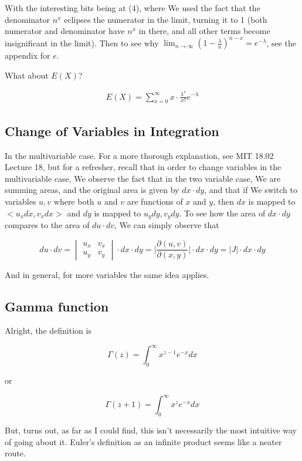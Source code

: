 \documentclass{article}
\begin{document}
			With the interesting bits being at (4), where We used the fact that the denominator $n^x$ eclipses the numerator in the limit, turning it to 1 (both numerator and denominator have $n^x$ in there, and all other terms become insignificant in the limit). Then to see why $\lim_{n\to\infty}\left(1 -\frac{\lambda}{n}\right)^{n-x} = e^{-\lambda}$, see the appendix for $e$.
			
			What about $E(X)$?
			
			\begin{align}
				E(X) = \sum^\infty_{x=0} x\cdot \frac{\lambda^x}{x!}e^{-\lambda}
			\end{align}
			
	\subsection{Change of Variables in Integration}
	
		In the multivariable case. For a more thorough explanation, see MIT 18.02 Lecture 18, but for a refresher, recall that in order to change variables in the multivariable case, We observe the fact that in the two variable case, We are summing areas, and the original area is given by $dx\cdot dy$, and that if We switch to variables $u, v$ where both $u$ and $v$ are functions of $x$ and $y$, then $dx$ is mapped to $<u_xdx, v_xdx>$ and $dy$ is mapped to $u_ydy, v_ydy$. To see how the area of $dx\cdot dy$ compares to the area of $du\cdot dv$, We can simply observe that
		
		\[
		du\cdot dv = 
		\begin{vmatrix}
		u_x & v_x\\
		u_y & v_y
		\end{vmatrix}
		\cdot dx\cdot dy =  \bigg|\frac{\partial(u, v)}{\partial(x, y)} \bigg|\cdot dx\cdot dy = |J|\cdot dx\cdot dy \]
			
		And in general, for more variables the same idea applies.
		
	\subsection{Gamma function}
	
		Alright, the definition is
		
		\[ \Gamma(z) = \int_0^\infty x^{z-1}e^{-x} dx \]
		
		or
		
		\[ \Gamma(z+1) = \int_0^\infty x^{z}e^{-x} dx \]
		
		But, turns out, as far as I could find, this isn't necessarily the most intuitive way of going about it. Euler's definition as an infinite product seems like a neater route.
		
\end{document}
